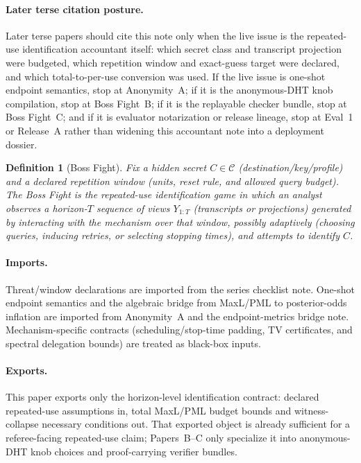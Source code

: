 \documentclass[11pt]{article}
\newcommand{\C}{\mathcal{C}} %
\newtheorem{definition}{Definition}
\begin{document}
\paragraph{Later terse citation posture.}
Later terse papers should cite this note only when the live issue is the repeated-use identification accountant itself: which secret class and transcript projection were budgeted, which repetition window and exact-guess target were declared, and which total-to-per-use conversion was used.
If the live issue is one-shot endpoint semantics, stop at Anonymity~A; if it is the anonymous-DHT knob compilation, stop at Boss Fight~B; if it is the replayable checker bundle, stop at Boss Fight~C; and if it is evaluator notarization or release lineage, stop at Eval~1 or Release~A rather than widening this accountant note into a deployment dossier.\cite{series:oddsinflation,series:bossfightB,series:bossfightC,series:evalnotary,series:releaseproperty}

\begin{definition}[Boss Fight]\label{def:bossfight}
Fix a hidden secret $C\in\C$ (destination/key/profile) and a declared repetition window (units, reset rule, and allowed query budget).
The \emph{Boss Fight} is the repeated-use identification game in which an analyst observes a horizon-$T$ sequence of views $Y_{1:T}$ (transcripts or projections) generated by interacting with the mechanism over that window, possibly adaptively (choosing queries, inducing retries, or selecting stopping times), and attempts to identify $C$.
\end{definition}

\paragraph{Imports.}
Threat/window declarations are imported from the series checklist note.\cite{series:threatwindows}
One-shot endpoint semantics and the algebraic bridge from MaxL/PML to posterior-odds inflation are imported from Anonymity~A and the endpoint-metrics bridge note.\cite{series:oddsinflation,series:endpointbridge}
Mechanism-specific contracts (scheduling/stop-time padding, TV certificates, and spectral delegation bounds) are treated as black-box inputs.\cite{series:schedcompiler,series:knapsacktransport,series:prefixcapacities,series:manytestinglowerbounds,series:stoptimeaddendum,series:spectral}

\paragraph{Exports.}
This paper exports only the horizon-level identification contract: declared repeated-use assumptions in, total MaxL/PML budget bounds and witness-collapse necessary conditions out.
That exported object is already sufficient for a referee-facing repeated-use claim; Papers~B--C only specialize it into anonymous-DHT knob choices and proof-carrying verifier bundles.
\end{document}
